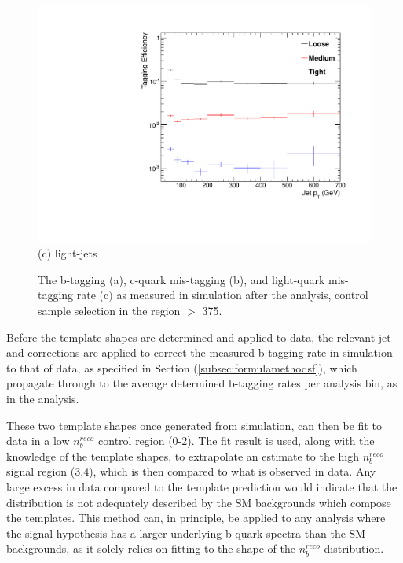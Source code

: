 \begin{figure}[ht]
\begin{minipage}[b]{0.48\linewidth}
\includegraphics[width = 1.0\linewidth]{plots/lighjet_PtDistribution_Htbin_Template_375.pdf}
\centering (c) light-jets
\end{minipage}
\caption[The b-tagging (a), c-quark mis-tagging (b), and light-quark mis-tagging rate (c$)$ as measured in simulation after the \alphat analysis, \mupjets control sample selection in the region \theht $>$ 375.]{The b-tagging (a), c-quark mis-tagging (b), and light-quark mis-tagging rate (c$)$ as measured in simulation after the \alphat analysis, \mupjets control sample selection in the region \theht $>$ 375.}
\label{fig:templatetaggingefficiencies}
\end{figure}

Before the template shapes are determined and applied to data, the relevant jet \pt and \eta corrections are applied to correct the measured b-tagging rate in simulation to that of data, as specified in Section (\ref{subsec:formulamethodsf}), which propagate through to the average determined b-tagging rates per analysis \theht bin, as in the \alphat analysis.  

These two template shapes once generated from simulation, can then be fit to data in a low $n_{b}^{reco}$ control region (0-2). The fit result is used, along with the knowledge of the template shapes, to extrapolate an estimate to the high $n_{b}^{reco}$ signal region (3,4), which is then compared to what is observed in data. Any large excess in data compared to the template prediction would indicate that the \nbreco distribution is not adequately described by the \ac{SM} backgrounds which compose the templates. This method can, in principle, be applied to any analysis where the signal hypothesis has a larger underlying b-quark spectra than the \ac{SM} backgrounds, as it solely relies on fitting to the shape of the $n_{b}^{reco}$ distribution. 

